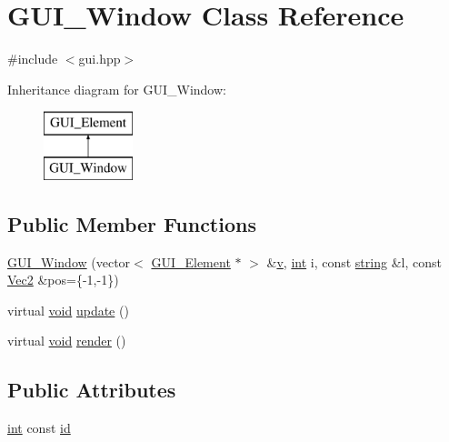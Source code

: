 \hypertarget{class_g_u_i___window}{\section{G\-U\-I\-\_\-\-Window Class Reference}
\label{class_g_u_i___window}
}


{\ttfamily \#include $<$gui.\-hpp$>$}

Inheritance diagram for G\-U\-I\-\_\-\-Window\-:\begin{figure}[H]
\begin{center}
\leavevmode
\includegraphics[height=2.000000cm]{class_g_u_i___window}
\end{center}
\end{figure}
\subsection*{Public Member Functions}
\begin{DoxyCompactItemize}
\item 
\hyperlink{class_g_u_i___window_a08ce7227b3bab8d4ae1192286694aab1}{G\-U\-I\-\_\-\-Window} (vector$<$ \hyperlink{class_g_u_i___element}{G\-U\-I\-\_\-\-Element} $\ast$ $>$ \&\hyperlink{_s_d_l__opengl_8h_a10a82eabcb59d2fcd74acee063775f90}{v}, \hyperlink{_s_d_l__thread_8h_a6a64f9be4433e4de6e2f2f548cf3c08e}{int} i, const \hyperlink{_s_d_l__opengl__glext_8h_ae84541b4f3d8e1ea24ec0f466a8c568b}{string} \&l, const \hyperlink{class_vec2}{Vec2} \&pos=\{-\/1,-\/1\})
\item 
virtual \hyperlink{_s_d_l__opengles2__gl2ext_8h_ae5d8fa23ad07c48bb609509eae494c95}{void} \hyperlink{class_g_u_i___window_a12a4b05b11771a93ff7da263a52a51d7}{update} ()
\item 
virtual \hyperlink{_s_d_l__opengles2__gl2ext_8h_ae5d8fa23ad07c48bb609509eae494c95}{void} \hyperlink{class_g_u_i___window_aac703a5538d045a5ce555d8389a2dc32}{render} ()
\end{DoxyCompactItemize}
\subsection*{Public Attributes}
\begin{DoxyCompactItemize}
\item 
\hyperlink{_s_d_l__thread_8h_a6a64f9be4433e4de6e2f2f548cf3c08e}{int} const \hyperlink{class_g_u_i___window_ae119bbcc132008e2d5030ba0b9f9b950}{id}
\end{DoxyCompactItemize}
